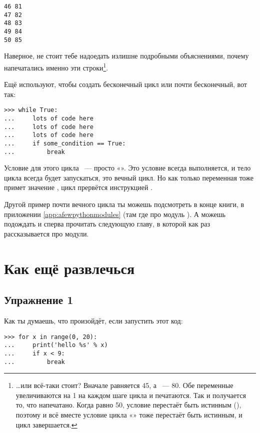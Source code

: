 \begin{listing}
\begin{verbatim}
46 81
47 82
48 83
49 84
50 85
\end{verbatim}
\end{listing}

Наверное, не стоит тебе надоедать излишне подробными объяснениями, почему напечатались именно эти строки\footnote{…или всё-таки стоит? Вначале  равняется 45, а  — 80. Обе переменные увеличиваются на 1 на каждом шаге цикла и печатаются. Так и получается то, что напечатано. Когда  равно 50, условие  перестаёт быть истинным (), поэтому и всё вместе условие цикла «» тоже перестаёт быть истинным, и цикл завершается.}.

Ещё  используют, чтобы создать бесконечный цикл или почти бесконечный, вот так:

\begin{verbatim}
>>> while True:
...     lots of code here
...     lots of code here
...     lots of code here
...     if some_condition == True:
...         break
\end{verbatim}

Условие для этого цикла  — просто «». Это условие всегда выполняется, и тело цикла всегда будет запускаться, это вечный цикл. Но как только переменная  тоже примет значение , цикл прервётся инструкцией .

Другой пример почти вечного цикла ты можешь подсмотреть в конце книги, в приложении \ref{app:afewpythonmodules} (там где про модуль ). А можешь подождать и сперва прочитать следующую главу, в которой как раз рассказывается про модули.

\section{Как ещё развлечься}


\subsection*{Упражнение 1}
Как ты думаешь, что произойдёт, если запустить этот код:

\begin{listing}
\begin{verbatim}
>>> for x in range(0, 20):
...     print('hello %s' % x)
...     if x < 9:
...         break
\end{verbatim}
\end{listing}

